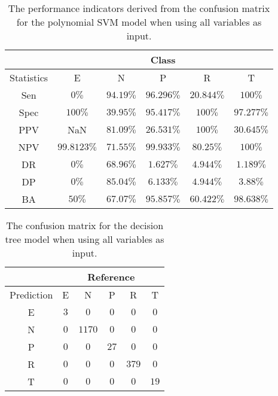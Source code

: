 \begin{table}[!ht]
	\centering
	\begin{tabular}{|c|c|c|c|c|c|}
		\hline
		 & \multicolumn{5}{c|}{Class} \\ \hline
		Statistics & E & N & P & R & T \\ \hline
		Sen & $0\%$ & $94.19\%$ & $96.296\%$ & $20.844\%$ & $100\%$ \\ \hline
		Spec & $100\%$ & $39.95\%$ & $95.417\%$ & $100\%$ & $97.277\%$ \\ \hline
		PPV & NaN & $81.09\%$ & $26.531\%$ & $100\%$ & $30.645\%$ \\ \hline
		NPV & $99.8123\%$ & $71.55\%$ & $99.933\%$ & $80.25\%$ & $100\%$ \\ \hline
		DR & $0\%$ & $68.96\%$ & $1.627\%$ & $4.944\%$ & $1.189\%$ \\ \hline
		DP & $0\%$ & $85.04\%$ & $6.133\%$ & $4.944\%$ & $3.88\%$ \\ \hline
		BA & $50\%$ & $67.07\%$ & $95.857\%$ & $60.422\%$ & $98.638\%$ \\ \hline
	\end{tabular}
	\caption{The performance indicators derived from the confusion matrix for the polynomial SVM model when using all variables as input.}
	\label{tab:cs:reverse:all:svmPoly}
\end{table}

\begin{table}[!ht]
	\centering
	\begin{tabular}{|c|c|c|c|c|c|}
		\hline
		 & \multicolumn{5}{|c|}{Reference} \\ \hline
		 Prediction & E & N & P & R & T \\ \hline
		 E & $3$ & $0$ & $0$ & $0$ & $0$ \\ \hline
		 N & $0$ & $1170$ & $0$ & $0$ & $0$ \\ \hline
		 P & $0$ & $0$ & $27$ & $0$ & $0$ \\ \hline
		 R & $0$ & $0$ & $0$ & $379$ & $0$ \\ \hline
		 T & $0$ & $0$ & $0$ & $0$ & $19$ \\ \hline
	\end{tabular}
	\caption{The confusion matrix for the decision tree model when using all variables as input.}
	\label{tab:cm:all:C5.0}
\end{table}

